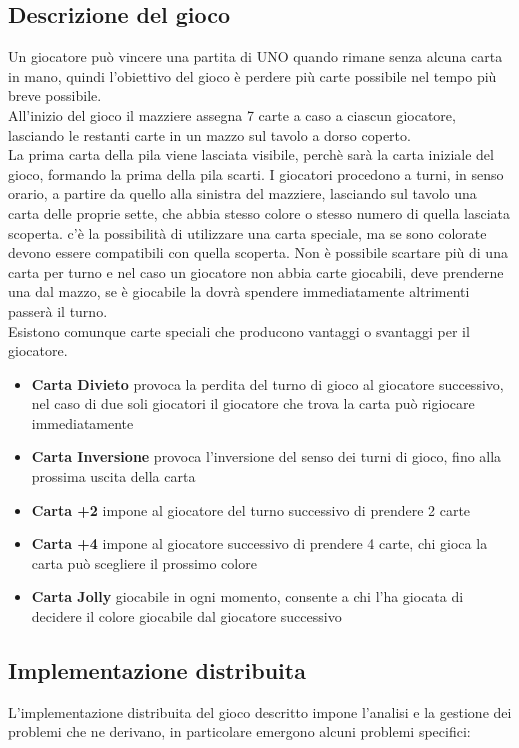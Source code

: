 \documentclass[10pt,a4paper]{article}
\begin{document}
\subsection{Descrizione del gioco}
Un giocatore può vincere una partita di UNO quando rimane senza alcuna carta in mano, quindi l'obiettivo del gioco è perdere più carte possibile nel tempo più breve possibile.\\All'inizio del gioco il mazziere assegna 7 carte a caso a ciascun giocatore, lasciando le restanti carte in un mazzo sul tavolo a dorso coperto.\\ La prima carta della pila viene lasciata visibile, perchè sarà la carta iniziale del gioco, formando la prima della pila scarti. I giocatori procedono a turni, in senso orario, a partire da quello alla sinistra del mazziere, lasciando sul tavolo una carta delle proprie sette, che abbia stesso colore o stesso numero di quella lasciata scoperta. c'è la possibilità di utilizzare una carta speciale, ma se sono colorate devono essere compatibili con quella scoperta. Non è possibile scartare più di una carta per turno e nel caso un giocatore non abbia carte giocabili, deve prenderne una dal mazzo, se è giocabile la dovrà spendere immediatamente altrimenti passerà il turno.\\ Esistono comunque carte speciali che producono vantaggi o svantaggi per il giocatore.\\

\begin{itemize}
\item \textbf{Carta Divieto} provoca la perdita del turno di gioco al giocatore successivo, nel caso di due soli giocatori il giocatore che trova la carta può rigiocare immediatamente
\item \textbf{Carta Inversione} provoca l'inversione del senso dei turni di gioco, fino alla prossima uscita della carta
\item \textbf{Carta +2} impone al giocatore del turno successivo di prendere 2 carte
\item \textbf{Carta +4} impone al giocatore successivo di prendere 4 carte, chi gioca la carta può scegliere il prossimo colore
\item \textbf{Carta Jolly} giocabile in ogni momento, consente a chi l'ha giocata di decidere il colore giocabile dal giocatore successivo
\end{itemize}

\subsection{Implementazione distribuita}
L'implementazione distribuita del gioco descritto impone l'analisi e la gestione dei problemi che ne derivano, in particolare emergono alcuni problemi specifici:
\end{document}
